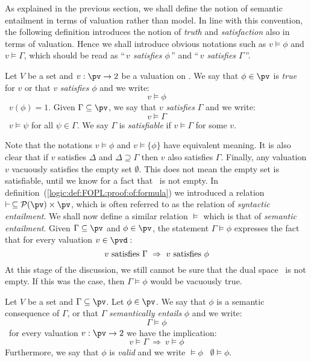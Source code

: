 As explained in the previous section, we shall define the notion of
semantic entailment in terms of valuation rather than model. In line
with this convention, the following definition introduces the notion
of {\em truth} and {\em satisfaction} also in terms of valuation.
Hence we shall introduce obvious notations such as $v\vDash\phi$ and
$v\vDash\Gamma$, which should be read as ``\,{\em $v$ satisfies
$\phi$}\,'' and ``\,{\em $v$ satisfies $\Gamma$}\,''.

\begin{defin}\label{logic:def:FOPL:semantics:valuation:truth}
Let $V$ be a set and $v:\pv\to 2$ be a valuation on \pv. We say that
$\phi\in\pv$ is {\em true} for $v$  or that $v$ {\em satisfies}
$\phi$ and we write:
    \[
    v\vDash\phi
    \]
\ifand\ $v(\phi)=1$. Given $\Gamma\subseteq\pv$, we say that $v$
{\em satisfies} $\Gamma$ and we write:
    \[
    v\vDash\Gamma
    \]
\ifand\ $v\vDash\psi$ for all $\psi\in\Gamma$. We say $\Gamma$ is
{\em satisfiable} if $v\vDash\Gamma$ for some $v$.
\end{defin}

Note that the notations $v\vDash\phi$ and $v\vDash\{\phi\}$ have
equivalent meaning. It is also clear that if $v$ satisfies $\Delta$
and $\Delta\supseteq\Gamma$ then $v$ also satisfies $\Gamma$.
Finally, any valuation $v$ vacuously satisfies the empty set
$\emptyset$. This does not mean the empty set is satisfiable, until
we know for a fact that \pvd\ is not empty. In
definition~(\ref{logic:def:FOPL:proof:of:formula}) we introduced a
relation $\vdash\,\subseteq{\cal P}(\pv)\times\pv$, which is often
referred to as the relation of {\em syntactic entailment}. We shall
now define a similar relation $\vDash$ which is that of {\em
semantic entailment}. Given $\Gamma\subseteq\pv$ and $\phi\in\pv$,
the statement $\Gamma\vDash\phi$ expresses the fact that for every
valuation $v\in\pvd$\,:
    \[
    v\mbox{\ satisfies\ }\Gamma\ \Rightarrow\ v\mbox{\ satisfies\
    }\phi
    \]
At this stage of the discussion, we still cannot be sure that the
dual space \pvd\ is not empty. If this was the case, then
$\Gamma\vDash\phi$ would be vacuously true.

\index{gamma@$\Gamma\vDash\phi$ : $\Gamma$ semantically
entails $\phi$} 
\begin{defin}\label{logic:def:FOPL:semantics:entailments}
Let $V$ be a set and $\Gamma\subseteq\pv$. Let $\phi\in\pv$. We say
that $\phi$ is a semantic consequence of $\Gamma$, or that $\Gamma$
{\em semantically entails} $\phi$ and we write:
    \[
    \Gamma\vDash\phi
    \]
\ifand\ for every valuation $v:\pv\to 2$ we have the implication:
    \[
    v\vDash\Gamma\ \Rightarrow\ v\vDash\phi
    \]
Furthermore, we say that $\phi$ is {\em valid} and we write
$\vDash\phi$ \ifand\ $\emptyset\vDash\phi$.
\end{defin}

